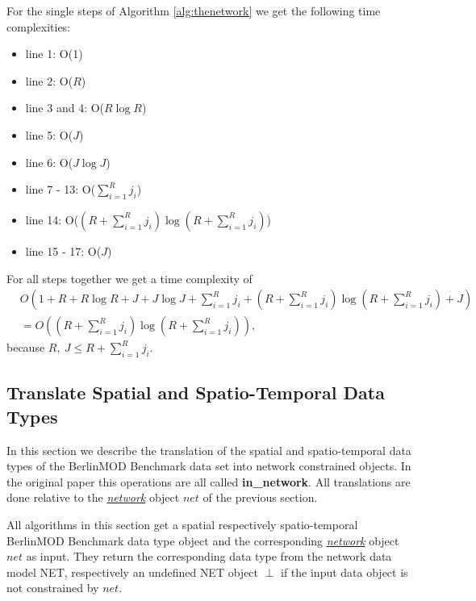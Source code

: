 \documentclass[a4paper]{article}
\newcommand{\bmodb} {BerlinMOD Benchmark}
\newcommand{\op}[1]{\textbf{#1}}
\newcommand{\dt}[1]{\textsl{\underline{#1}}}
\begin{document}
For the single steps of Algorithm \ref{alg:thenetwork} we get the following time 
complexities:
\begin{itemize}
  \item[] line 1: O(1)
  \item[] line 2: O($R$)
  \item[] line 3 and 4: O($R \log R$)
  \item[] line 5: O($J$)
  \item[] line 6: O($J \log J$)
  \item[] line 7 - 13: O($\sum_{i=1}^{R}{j_i}$)
  \item[] line 14: O($(R + \sum_{i=1}^{R}{j_i}) \log ({R +
\sum_{i=1}^{R}{j_i}})$)
  \item[] line 15 - 17: O($J$)
\end{itemize}
For all steps together we get a time complexity of
\begin{align*}
&O(1 + R + R \log R + J + J \log J + \sum_{i=1}^{R}{j_i} + (R +
\sum_{i=1}^{R}{j_i}) \log (R + \sum_{i=1}^{R}{j_i}) + J)\\
&= O((R + \sum_{i=1}^{R}{j_i}) \log (R  + \sum_{i=1}^{R}{j_i})),
\end{align*}
because $R,\ J \leq R + \sum_{i=1}^{R}{j_i}$.
\subsection{Translate Spatial and Spatio-Temporal Data Types}
\label{sec:translateSTdata}
In this section we describe the translation of the spatial and spatio-temporal
data types of the \bmodb{} data set into network constrained
objects. In the original paper this operations are all called \op{in\_network}.
All translations are done relative to the \dt{network} object $net$ of the
previous section.

All algorithms in this section get a spatial respectively spatio-temporal
\bmodb{}
data type object and the corresponding \dt{network} object $net$ as input.
They return the corresponding data type from the network data model NET,
respectively an undefined NET object $\perp$ if the input data object is not 
constrained by $net$.
\end{document}
